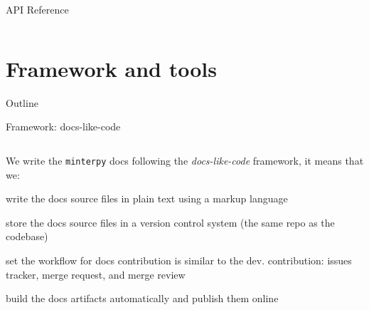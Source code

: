 \documentclass[english,aspectratio=169]{beamer}
\let\tempone\itemize
\let\temptwo\enditemize
\renewenvironment{itemize}{\tempone\addtolength{\itemsep}{0.35\baselineskip}}{\temptwo}
\begin{document}
\begin{frame}{API Reference}
\begin{columns}[onlytextwidth]
\end{columns}

\end{frame}


\section{Framework and tools}

\begin{frame}{Outline}
\tableofcontents[currentsection]
\end{frame}

\begin{frame}{Framework: docs-like-code}
\footnotesize

\begin{columns}[onlytextwidth]

\begin{column}{0.5\textwidth}

We write the \texttt{minterpy} docs following the \emph{docs-like-code} framework,
it means that we:

\begin{itemize}
    \item write the docs source files in plain text using a markup language
    \item store the docs source files in a version control system (the same repo as the codebase)
    \item set the workflow for docs contribution is similar to the dev. contribution:
          issues tracker, merge request, and merge review
    \item build the docs artifacts automatically and publish them online
\end{itemize}

\end{column}


\end{columns}
\end{frame}
\end{document}
